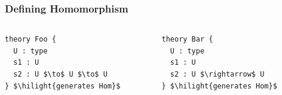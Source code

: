 \documentclass[t,12pt,numbers,fleqn,usenames,xcolor=dvipsnames]{beamer}
\newcommand{\hilight}[1]{\colorbox{yellow}{#1}}
\begin{document}
\begin{frame}[fragile]
\frametitle{Defining Homomorphism}
\begin{columns}
\scriptsize
\begin{column}{0.45\textwidth}
	\begin{lstlisting}
theory Foo { 
  U : type 
  s1 : U 
  s2 : U $\to$ U $\to$ U
} $\hilight{generates Hom}$
	\end{lstlisting}
\end{column}
\begin{column}{0.45\textwidth}
	\begin{lstlisting}
theory Bar {
  U : type 
  s1 : U 
  s2 : U $\rightarrow$ U 
} $\hilight{generates Hom}$
	\end{lstlisting}
\end{column}
\end{columns}
\end{frame}

		

\end{document}
